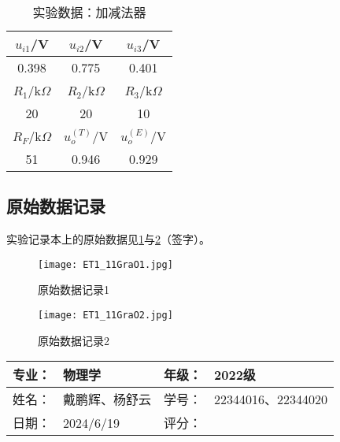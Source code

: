 \documentclass[dvipsnames, svgnames,a4paper,11pt]{article}
\begin{document}
\begin{enumerate}
		\begin{table}[htbp]
			\centering
			\caption{实验数据：加减法器}
			\label{tab:tab5}
			\begin{tabular}{|c|c|c|}
				\hline
				\( u_{i1} \)/V & \( u_{i2} \)/V & \( u_{i3} \)/V \\
				\hline
				0.398 & 0.775 & 0.401 \\
				\hline
				\( R_1 \)/k\(\Omega\) & \( R_2 \)/k\(\Omega\) & \( R_3 \)/k\(\Omega\) \\
				\hline
				20 & 20 & 10 \\
				\hline
				\( R_F \)/k\(\Omega\) & \( u_o^{(T)} \)/V & \( u_o^{(E)} \)/V \\
				\hline
				51 & 0.946 & 0.929 \\
				\hline
			\end{tabular}
		\end{table}
		
	\end{enumerate}	
	
	
	\clearpage
	\subsection{原始数据记录}
	实验记录本上的原始数据见\cref{fig:figO1}与\cref{fig:figO2}（签字）。
	
	\begin{figure}[htbp]
		\centering
		\texttt{[image: ET1\_11GraO1.jpg]}
		\caption{原始数据记录1}
		\label{fig:figO1}
	\end{figure}
		
	\begin{figure}[htbp]
		\centering
		\texttt{[image: ET1\_11GraO2.jpg]}
		\caption{原始数据记录2}
		\label{fig:figO2}
	\end{figure}
	
	
	
	
	
	
	
	\clearpage
	
	\begin{table}
		\renewcommand\arraystretch{1.7}
		\begin{tabularx}{\textwidth}{|X|X|X|X|}
			\hline
			专业：& 物理学 &年级：& 2022级\\
			\hline
			姓名： & 戴鹏辉、杨舒云 & 学号：& 22344016、22344020\\
			\hline
			日期：& 2024/6/19 & 评分： &\\
			\hline
		\end{tabularx}
	\end{table}
	
\end{document}
